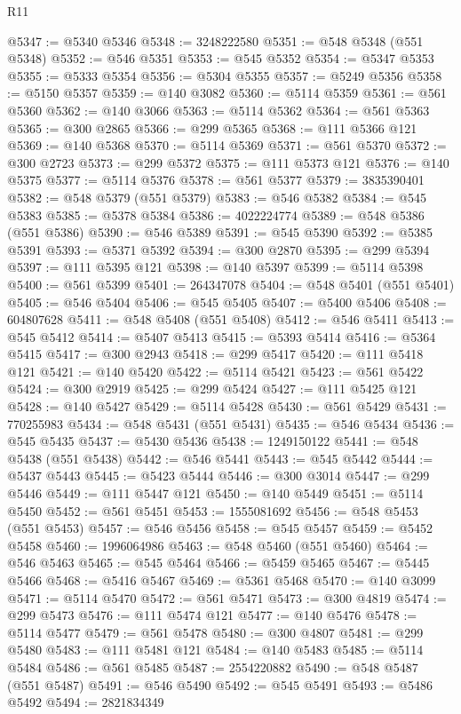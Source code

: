\begin{lexlean}{R11}
\begin{coremodule}
{{{{{{{{{{{{{{{{{{{{{{{{{{{{{{{{{{{{{{{{{{{{{{{{{{{{{{{{{{{{{{{{{{{{{{{{{{{{{{{{{{@5347 := @5340 @5346
@5348 := 3248222580
@5351 := @548 @5348 (@551 @5348)
@5352 := @546 @5351
@5353 := @545 @5352
@5354 := @5347 @5353
@5355 := @5333 @5354
@5356 := @5304 @5355
@5357 := @5249 @5356
@5358 := @5150 @5357
@5359 := @140 @3082
@5360 := @5114 @5359
@5361 := @561 @5360
@5362 := @140 @3066
@5363 := @5114 @5362
@5364 := @561 @5363
@5365 := @300 @2865
@5366 := @299 @5365
@5368 := @111 @5366 @121
@5369 := @140 @5368
@5370 := @5114 @5369
@5371 := @561 @5370
@5372 := @300 @2723
@5373 := @299 @5372
@5375 := @111 @5373 @121
@5376 := @140 @5375
@5377 := @5114 @5376
@5378 := @561 @5377
@5379 := 3835390401
@5382 := @548 @5379 (@551 @5379)
@5383 := @546 @5382
@5384 := @545 @5383
@5385 := @5378 @5384
@5386 := 4022224774
@5389 := @548 @5386 (@551 @5386)
@5390 := @546 @5389
@5391 := @545 @5390
@5392 := @5385 @5391
@5393 := @5371 @5392
@5394 := @300 @2870
@5395 := @299 @5394
@5397 := @111 @5395 @121
@5398 := @140 @5397
@5399 := @5114 @5398
@5400 := @561 @5399
@5401 := 264347078
@5404 := @548 @5401 (@551 @5401)
@5405 := @546 @5404
@5406 := @545 @5405
@5407 := @5400 @5406
@5408 := 604807628
@5411 := @548 @5408 (@551 @5408)
@5412 := @546 @5411
@5413 := @545 @5412
@5414 := @5407 @5413
@5415 := @5393 @5414
@5416 := @5364 @5415
@5417 := @300 @2943
@5418 := @299 @5417
@5420 := @111 @5418 @121
@5421 := @140 @5420
@5422 := @5114 @5421
@5423 := @561 @5422
@5424 := @300 @2919
@5425 := @299 @5424
@5427 := @111 @5425 @121
@5428 := @140 @5427
@5429 := @5114 @5428
@5430 := @561 @5429
@5431 := 770255983
@5434 := @548 @5431 (@551 @5431)
@5435 := @546 @5434
@5436 := @545 @5435
@5437 := @5430 @5436
@5438 := 1249150122
@5441 := @548 @5438 (@551 @5438)
@5442 := @546 @5441
@5443 := @545 @5442
@5444 := @5437 @5443
@5445 := @5423 @5444
@5446 := @300 @3014
@5447 := @299 @5446
@5449 := @111 @5447 @121
@5450 := @140 @5449
@5451 := @5114 @5450
@5452 := @561 @5451
@5453 := 1555081692
@5456 := @548 @5453 (@551 @5453)
@5457 := @546 @5456
@5458 := @545 @5457
@5459 := @5452 @5458
@5460 := 1996064986
@5463 := @548 @5460 (@551 @5460)
@5464 := @546 @5463
@5465 := @545 @5464
@5466 := @5459 @5465
@5467 := @5445 @5466
@5468 := @5416 @5467
@5469 := @5361 @5468
@5470 := @140 @3099
@5471 := @5114 @5470
@5472 := @561 @5471
@5473 := @300 @4819
@5474 := @299 @5473
@5476 := @111 @5474 @121
@5477 := @140 @5476
@5478 := @5114 @5477
@5479 := @561 @5478
@5480 := @300 @4807
@5481 := @299 @5480
@5483 := @111 @5481 @121
@5484 := @140 @5483
@5485 := @5114 @5484
@5486 := @561 @5485
@5487 := 2554220882
@5490 := @548 @5487 (@551 @5487)
@5491 := @546 @5490
@5492 := @545 @5491
@5493 := @5486 @5492
@5494 := 2821834349
}}}}}}}}}}}}}}}}}}}}}}}}}}}}}}}}}}}}}}}}}}}}}}}}}}}}}}}}}}}}}}}}}}}}}}}}}}}}}}}}}}
\end{coremodule}
\end{lexlean}
